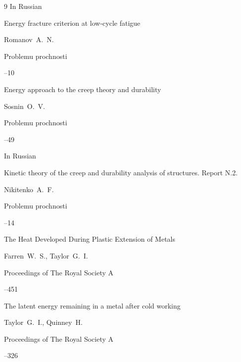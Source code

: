 \begin{thebibliography}{9}
\lang In Russian

\paper Energy fracture criterion at low-cycle fatigue

\by Romanov~A.\, N.

\jour Problemu prochnosti



--10




\paper Energy approach to the creep theory and durability

\by Sosnin~O.~V.

\jour Problemu prochnosti



--49




\lang In Russian

\paper Kinetic theory of the creep and durability analysis of structures. Report N.2.

\by Nikitenko~A.~F.

\jour Problemu prochnosti



--14




\paper The Heat Developed During Plastic Extension of Metals

\by Farren~W.~S., Taylor~G.~I.

\jour Proceedings of The Royal Society A



--451




\paper The latent energy remaining in a metal after cold working

\by  Taylor~G.~I., Quinney~H.

\jour Proceedings of The Royal Society A



--326





\end{thebibliography}
